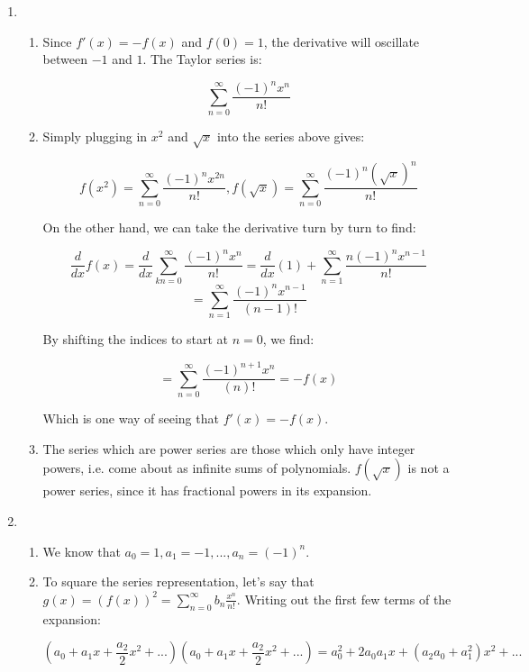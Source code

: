 		\begin{enumerate}
			\item 
            \begin{enumerate} 
            \item Since $f'(x) = -f(x)$ and $f(0) = 1$, the derivative will oscillate between $-1$ and $1$. The Taylor series is:

            \[\sum_{n=0}^\infty \frac{(-1)^nx^n}{n!}\]

            \item Simply plugging in $x^2$ and $\sqrt{x}$ into the series above gives:

            \[f(x^2)=\sum_{n=0}^\infty \frac{(-1)^nx^{2n}}{n!}, f(\sqrt{x}) = \sum_{n=0}^\infty \frac{(-1)^n(\sqrt{x})^n}{n!}\]

            On the other hand, we can take the derivative turn by turn to find:

            \[\frac{d}{dx}f(x) = \frac{d}{dx} \sum_{k
        n=0}^\infty \frac{(-1)^nx^n}{n!} = \frac{d}{dx}(1)+\sum_{n=1}^\infty \frac{n(-1)^nx^{n-1}} {n!}\]
            \[= \sum_{n=1}^\infty \frac{(-1)^nx^{n-1}}{(n-1)!}\]

            By shifting the indices to start at $n=0$, we find:

            \[=\sum_{n=0}^\infty \frac{(-1)^{n+1}x^{n}}{(n)!} = -f(x)\]

            Which is one way of seeing that $f'(x) = -f(x)$. 

            \item The series which are power series are those which only have integer powers, i.e. come about as infinite sums of polynomials. $f(\sqrt{x})$ is not a power series, since it has fractional powers in its expansion. 
            \end{enumerate}

            \item 

            \begin{enumerate}
                \item We know that $a_0 = 1, a_1 = -1, ..., a_n = (-1)^n$.
                
                
                \item To square the series representation, let's say that $g(x) = (f(x))^2=\sum_{n=0}^\infty b_n \frac{x^n}{n!}$. Writing out the first few terms of the expansion:

                \[(a_0 + a_1x + \frac{a_2}{2}x^2 +...)(a_0 + a_1x + \frac{a_2}{2}x^2 +...) = a_0^2 + 2a_0a_1x + (a_2a_0 +a_1^2)x^2 + ...\]


\end{enumerate}
\end{enumerate}
